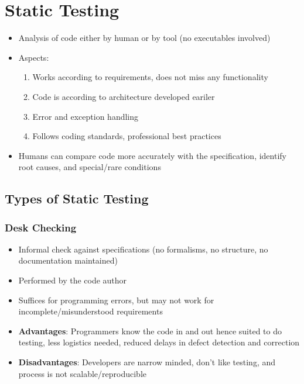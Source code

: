 \documentclass{article}
\begin{document}
\section{Static Testing}
\begin{itemize}
    \item Analysis of code either by human or by tool (no executables involved)
    
    \item Aspects: 
    \begin{enumerate}
        \item Works according to requirements, does not miss any functionality
        
        \item Code is according to architecture developed eariler
        
        \item Error and exception handling
        
        \item Follows coding standards, professional best practices 
    \end{enumerate}
    
    \item Humans can compare code more accurately with the specification, identify root causes, and special/rare conditions
\end{itemize}

\subsection{Types of Static Testing}
\subsubsection{Desk Checking}
\begin{itemize}
    \item Informal check against specifications (no formalisms, no structure, no documentation maintained)
    
    \item Performed by the code author
    
    \item Suffices for programming errors, but may not work for incomplete/misunderstood requirements
    
    \item \textbf{Advantages}: Programmers know the code in and out hence suited to do testing, less logistics needed, reduced delays in defect detection and correction
    
    \item \textbf{Disadvantages}: Developers are narrow minded, don't like testing, and process is not scalable/reproducible
\end{itemize}
\end{document}
